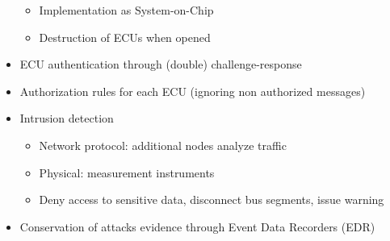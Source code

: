 \documentclass[11pt, paper=a4, twocolumn]{scrartcl}
\begin{document}
\begin{itemize}
\begin{itemize}
					\item Implementation as System-on-Chip
					\item Destruction of ECUs when opened
				\end{itemize}
			\item ECU authentication through (double) challenge-response
			\item Authorization rules for each ECU (ignoring non authorized messages)
			\item Intrusion detection
				\begin{itemize}
					\item Network protocol: additional nodes analyze traffic
					\item Physical: measurement instruments
					\item Deny access to sensitive data, disconnect bus segments, issue warning
				\end{itemize}
			\item Conservation of attacks evidence through Event Data Recorders (EDR)
		\end{itemize}
\end{document}
